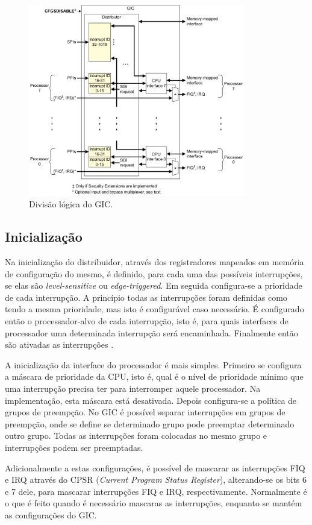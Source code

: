 \begin{figure}[ht!]
    \centering
    \includegraphics[width=9.5cm]{figuras/gic}
    \caption{Divisão lógica do GIC.}
    \label{img:gic}
\end{figure}

\subsection{Inicialização}

Na inicialização do distribuidor, através dos registradores mapeados em memória de configuração do mesmo, é definido, para cada uma das possíveis interrupções, se elas são \emph{level-sensitive} ou \emph{edge-triggered}.
Em seguida configura-se a prioridade de cada interrupção. A princípio todas as interrupções foram definidas como tendo a mesma prioridade, mas isto é configurável caso necessário.
É configurado então o processador-alvo de cada interrupção, isto é, para quais interfaces de processador uma determinada interrupção será encaminhada. Finalmente então são ativadas as interrupções \cite{gic}.

A inicialização da interface do processador é mais simples. Primeiro se configura a máscara de prioridade da CPU, isto é, qual é o nível de prioridade mínimo que uma interrupção precisa ter para interromper aquele processador. Na implementação, esta máscara está desativada. Depois configura-se a política de grupos de preempção. No GIC é possível separar interrupções em grupos de preempção, onde se define se determinado grupo pode preemptar determinado outro grupo. Todas as interrupções foram colocadas no mesmo grupo e interrupções podem ser preemptadas.

Adicionalmente a estas configurações, é possível de mascarar as interrupções FIQ e IRQ através do CPSR (\emph{Current Program Status Register}), alterando-se os bits 6 e 7 dele, para mascarar interrupções FIQ e IRQ, respectivamente. Normalmente é o que é feito quando é necessário mascaras as interrupções, enquanto se mantém as configurações do GIC.

